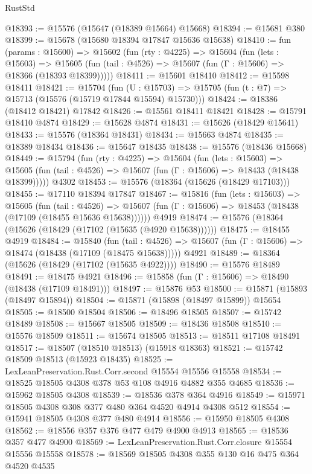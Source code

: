 \begin{lexlean}{RustStd}
\begin{coremodule}
@18393 := @15576 (@15647 (@18389 @15664) @15668)
@18394 := @15681 @380
@18399 := @15678 (@15680 @18394 @17847 @15636 @15638)
@18410 := fun (params : @15600) =>
  @15602
    (fun (rty : @4225) =>
    @15604
      (fun (lets : @15603) =>
      @15605 (fun (tail : @4526) => @15607 (fun (Γ : @15606) => @18366 (@18393 @18399)))))
@18411 := @15601 @18410
@18412 := @15598 @18411
@18421 := @15704
    (fun (U : @15703) => @15705 (fun (t : @7) => @15713 (@15576 (@15719 @17844 @15594) @15730)))
@18424 := @18386 (@18412 @18421) @17842
@18426 := @15561 @18411 @18421
@18428 := @15791 @18410 @4874
@18429 := @15628 @4874
@18431 := @15626 (@18429 @15641)
@18433 := @15576 (@18364 @18431)
@18434 := @15663 @4874
@18435 := @18389 @18434
@18436 := @15647 @18435
@18438 := @15576 (@18436 @15668)
@18449 := @15794
    (fun (rty : @4225) =>
    @15604
      (fun (lets : @15603) =>
      @15605 (fun (tail : @4526) => @15607 (fun (Γ : @15606) => @18433 (@18438 @18399)))))
    @4302
@18453 := @15576 (@18364 (@15626 (@18429 @17103)))
@18455 := @17110 @18394 @17847
@18467 := @15816
    (fun (lets : @15603) =>
    @15605
      (fun (tail : @4526) =>
      @15607 (fun (Γ : @15606) => @18453 (@18438 (@17109 (@18455 @15636 @15638))))))
    @4919
@18474 := @15576 (@18364 (@15626 (@18429 (@17102 (@15635 (@4920 @15638))))))
@18475 := @18455 @4919
@18484 := @15840
    (fun (tail : @4526) => @15607 (fun (Γ : @15606) => @18474 (@18438 (@17109 (@18475 @15638)))))
    @4921
@18489 := @18364 (@15626 (@18429 (@17102 (@15635 @4922))))
@18490 := @15576 @18489
@18491 := @18475 @4921
@18496 := @15858 (fun (Γ : @15606) => @18490 (@18438 (@17109 @18491)))
@18497 := @15876 @53
@18500 := @15871 (@15893 (@18497 @15894))
@18504 := @15871 (@15898 (@18497 @15899)) @15654
@18505 := @18500 @18504
@18506 := @18496 @18505
@18507 := @15742 @18489
@18508 := @15667 @18505
@18509 := @18436 @18508
@18510 := @15576 @18509
@18511 := @15674 @18505
@18513 := @18511 @17108 @18491
@18517 := @18507 (@18510 @18513) (@15918 @18363)
@18521 := @15742 @18509 @18513 (@15923 @18435)
@18525 := LexLeanPreservation.Rust.Corr.second @15554 @15556 @15558
@18534 := @18525 @18505 @4308 @378 @53 @108 @4916 @4882 @355 @4685
@18536 := @15962 @18505 @4308
@18539 := @18536 @378 @364 @4916
@18549 := @15971 @18505 @4308 @308 @377 @480 @364 @4520 @4914 @4308 @512
@18554 := @15941 @18505 @4308 @377 @480 @4914
@18556 := @15950 @18505 @4308
@18562 := @18556 @357 @376 @477 @479 @4900 @4913
@18565 := @18536 @357 @477 @4900
@18569 := LexLeanPreservation.Rust.Corr.closure @15554 @15556 @15558
@18578 := @18569 @18505 @4308 @355 @130 @16 @475 @364 @4520 @4535

\end{coremodule}
\end{lexlean}
